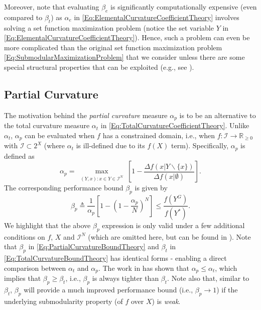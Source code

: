 \documentclass[letterpaper, 10 pt, conference]{ieeeconf}
\newcommand{\R}{\mathbb{R}}
\begin{document}
{Moreover, note that evaluating $\beta_e$ is significantly computationally expensive (even compared to $\beta_t$) as $\alpha_e$ in \eqref{Eq:ElementalCurvatureCoefficientTheory} involves solving a set function maximization problem (notice the set variable $Y$ in \eqref{Eq:ElementalCurvatureCoefficientTheory}). Hence, such a problem can even be more complicated than the original set function maximization problem \eqref{Eq:SubmodularMaximizationProblem} that we consider unless there are some special structural properties that can be exploited (e.g., see \cite{Sun2019}).



\subsection{Partial Curvature \cite{Liu2018}}
\label{SubSec:PartialCurvature}



The motivation behind the \emph{partial curvature} measure $\alpha_p$ is to be an alternative to the total curvature measure $\alpha_t$ in \eqref{Eq:TotalCurvatureCoefficientTheory}. Unlike $\alpha_t$, $\alpha_p$ can be evaluated when $f$ has a constrained domain, i.e., when $f:\mathcal{I}\rightarrow \R_{\geq0}$ with $\mathcal{I} \subset 2^X$ (where $\alpha_t$ is ill-defined due to its $f(X)$ term). Specifically, $\alpha_p$ is defined as
\begin{equation}\label{Eq:PartialCurvatureCoefficientTheory}
    \alpha_p = 
    \max_{\substack{(Y,x): x \in Y \in \mathcal{I}^N}}\left[1-\frac{\Delta f(x \vert Y \backslash \{x\}) }{\Delta f(x \vert \emptyset)}\right].
\end{equation}
The corresponding performance bound $\beta_p$ is given by 
\begin{equation}\label{Eq:PartialCurvatureBoundTheory}
    \beta_p \triangleq \frac{1}{\alpha_p}\left[1-\left(1-\frac{\alpha_p}{N}\right)^N\right] \leq \frac{f(Y^G)}{f(Y^*)}.
\end{equation}
We highlight that the above $\beta_p$ expression is only valid under a few additional conditions on $f$, $X$ and $\mathcal{I}^N$ (which are omitted here, but can be  found in \cite{Liu2018}). Note that $\beta_p$ in \eqref{Eq:PartialCurvatureBoundTheory} and $\beta_t$ in \eqref{Eq:TotalCurvatureBoundTheory} has identical forms - enabling a direct comparison between $\alpha_t$ and $\alpha_p$. The work in \cite{Liu2018} has shown that $\alpha_p \leq \alpha_t$, which implies that $\beta_p \geq \beta_t$, i.e., $\beta_p$ is always tighter than $\beta_t$. Note also that, similar to $\beta_t$, $\beta_p$ will provide a much improved performance bound (i.e., $\beta_p \rightarrow 1$) if the underlying submodularity property (of $f$ over $X$) is \emph{weak}.  

}
\end{document}
